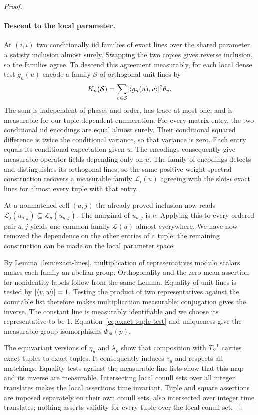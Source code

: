 \begin{proof}
\paragraph{Descent to the local parameter.}
At $(i,i)$ two conditionally iid families of exact lines over the
shared parameter $u$ satisfy inclusion almost surely. Swapping the
two copies gives reverse inclusion, so the families agree.
To descend this agreement measurably, for each local dense test $g_n(u)$
encode a family $\mathcal S$ of orthogonal unit lines by
\begin{equation}\label{eq:line-family-encoding}
 K_n(\mathcal S)=
   \sum_{v\in\mathcal S}\lvert \langle g_n(u),v\rangle\rvert^2\theta_v.
\end{equation}
The sum is independent of phases and order, has trace at most one,
and is measurable for our tuple-dependent enumeration. For every
matrix entry, the two conditional iid encodings are equal almost
surely. Their conditional squared difference is twice the conditional
variance, so that variance is zero. Each entry equals its conditional
expectation given $u$. The encodings consequently give measurable
operator fields depending only on $u$.
The family of encodings detects and distinguishes its orthogonal
lines, so the same positive-weight spectral construction recovers a
measurable family $\mathcal L_i(u)$ agreeing with the slot-$i$ exact
lines for almost every tuple with that entry.

At a nonmatched cell $(a,j)$ the already proved inclusion now reads
$\mathcal L_j(u_{a,j})\subseteq\mathcal L_a(u_{a,j})$.
The marginal of $u_{a,j}$ is $\nu$. Applying this to every ordered
pair $a,j$ yields one common family $\mathcal L(u)$ almost everywhere.
We have now removed the dependence on the other entries of a tuple:
the remaining construction can be made on the local parameter space.

By Lemma~\ref{lem:exact-lines}, multiplication of representatives
modulo scalars makes each family an abelian group. Orthogonality and
the zero-mean assertion for nonidentity labels follow from the same
Lemma. Equality of unit lines is tested by $\lvert \langle v,w\rangle\rvert=1$.
Testing the product of two representatives against the countable list
therefore makes multiplication measurable; conjugation gives the
inverse. The constant line is measurably identifiable and we choose
its representative to be $1$. Equation~\eqref{eq:exact-tuple-test}
and uniqueness give the measurable group isomorphisms $\Phi_{st}(p)$.

The equivariant versions of $\eta_u$ and $\lambda_p$ show that
composition with $T_Y^{-1}$ carries exact tuples to exact tuples.
It consequently induces $\tau_u$ and respects all matchings.
Equality tests against the measurable line lists show that this map
and its inverse are measurable. Intersecting local conull sets over
all integer translates makes the local assertions time invariant.
Tuple and square assertions are imposed separately on their own
conull sets, also intersected over integer time translates; nothing
asserts validity for every tuple over the local conull set.


\end{proof}
